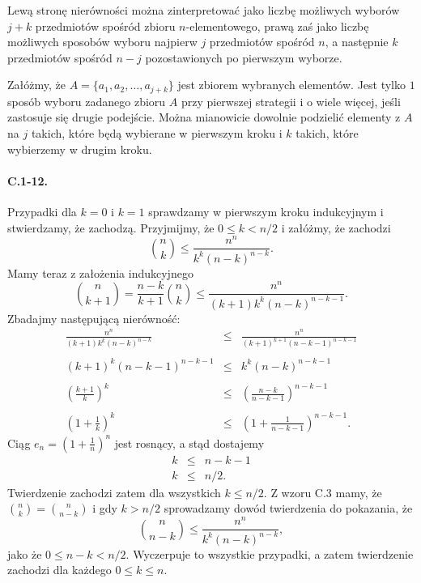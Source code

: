 Lewą stronę nierówności można zinterpretować jako liczbę możliwych wyborów $j+k$ przedmiotów spośród zbioru $n$-elementowego, prawą zaś jako liczbę możliwych sposobów wyboru najpierw $j$ przedmiotów spośród $n$, a następnie $k$ przedmiotów spośród $n-j$ pozostawionych po pierwszym wyborze.

Załóżmy, że $A=\{ a_1,a_2,\dots,a_{j+k}\}$ jest zbiorem wybranych elementów. Jest tylko $1$ sposób wyboru zadanego zbioru $A$ przy pierwszej strategii i o wiele więcej, jeśli zastosuje się drugie podejście. Można mianowicie dowolnie podzielić elementy z $A$ na $j$ takich, które będą wybierane w pierwszym kroku i $k$ takich, które wybierzemy w drugim kroku.

\paragraph{C.1-12.}
Przypadki dla $k=0$ i $k=1$ sprawdzamy w pierwszym kroku indukcyjnym i stwierdzamy, że zachodzą. Przyjmijmy, że $0\le k<n/2$ i załóżmy, że zachodzi
\[
	\binom{n}{k}\le\frac{n^n}{k^k(n-k)^{n-k}}.
\]
Mamy teraz z założenia indukcyjnego
\[
	\binom{n}{k+1} = \frac{n-k}{k+1}\binom{n}{k}\le\frac{n^n}{(k+1)k^k(n-k)^{n-k-1}}.
\]
Zbadajmy następującą nierówność:
\begin{eqnarray*}
	\frac{n^n}{(k+1)k^k(n-k)^{n-k}} &\le& \frac{n^n}{(k+1)^{k+1}(n-k-1)^{n-k-1}} \\\\
	(k+1)^k(n-k-1)^{n-k-1} &\le& k^k(n-k)^{n-k-1} \\\\
	\left(\frac{k+1}{k}\right)^k &\le& \left(\frac{n-k}{n-k-1}\right)^{n-k-1} \\\\
	\left(1+\frac{1}{k}\right)^k &\le& \left(1+\frac{1}{n-k-1}\right)^{n-k-1}.
\end{eqnarray*}
Ciąg $e_n=\left(1+\frac{1}{n}\right)^n$ jest rosnący, a stąd dostajemy
\begin{eqnarray*}
	k &\le& n-k-1 \\
	k &\le& n/2.
\end{eqnarray*}
Twierdzenie zachodzi zatem dla wszystkich $k\le n/2$. Z wzoru C.3 mamy, że $\binom{n}{k}=\binom{n}{n-k}$ i gdy $k>n/2$ sprowadzamy dowód twierdzenia do pokazania, że
\[
	\binom{n}{n-k}\le\frac{n^n}{k^k(n-k)^{n-k}},
\]
jako że $0\le n-k<n/2$. Wyczerpuje to wszystkie przypadki, a zatem twierdzenie zachodzi dla każdego $0\le k\le n$.


